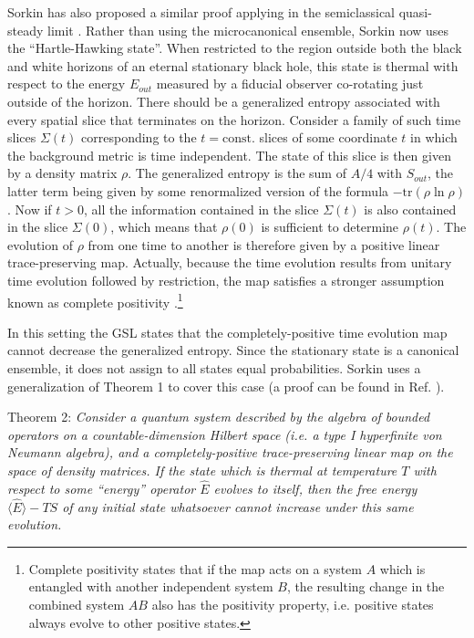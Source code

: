 \documentclass[12pt]{article}
\begin{document}
Sorkin has also proposed a similar proof applying in the semiclassical quasi-steady limit \cite{sorkin98}.  Rather than using the microcanonical ensemble, Sorkin now uses the ``Hartle-Hawking state''.  When restricted to the region outside both the black and white horizons of an eternal stationary black hole, this state is thermal with respect to the energy $E_{out}$ measured by a fiducial observer co-rotating just outside of the horizon.  There should be a generalized entropy associated with every spatial slice that terminates on the horizon.  Consider a family of such time slices $\Sigma(t)$ corresponding to the $t = \mathrm{const.}$ slices of some coordinate $t$ in which the background metric is time independent.  The state of this slice is then given by a density matrix $\rho$.  The generalized entropy is the sum of $A/4$ with $S_{out}$, the latter term being given by some renormalized version of the formula $-\mathrm{tr}(\rho \ln \rho)$.  Now if $t > 0$, all the information contained in the slice $\Sigma(t)$ is also contained in the slice $\Sigma(0)$, which means that $\rho(0)$ is sufficient to determine $\rho(t)$.  The evolution of $\rho$ from one time to another is therefore given by a positive linear trace-preserving map.  Actually, because the time evolution results from unitary time evolution followed by restriction, the map satisfies a stronger assumption known as complete positivity \cite{lindblad75}.\footnote{Complete positivity states that if the map acts on a system $A$ which is entangled with another independent system $B$, the resulting change in the combined system $AB$ also has the positivity property, i.e. positive states always evolve to other positive states.} 

In this setting the GSL states that the completely-positive time evolution map cannot decrease the generalized entropy.  Since the stationary state is a canonical ensemble, it does not assign to all states equal probabilities.  Sorkin uses a generalization of Theorem 1 to cover this case (a proof can be found in Ref. \cite{lindblad75}).

Theorem 2: \emph{Consider a quantum system described by the algebra of bounded operators on a countable-dimension Hilbert space (i.e. a type I hyperfinite von Neumann algebra), and a completely-positive trace-preserving linear map on the space of density matrices.  If the state which is thermal at temperature $T$ with respect to some ``energy'' operator $\hat{E}$ evolves to itself, then the free energy $\langle \hat{E} \rangle - TS$ of any initial state whatsoever cannot increase under this same evolution.}
\end{document}
